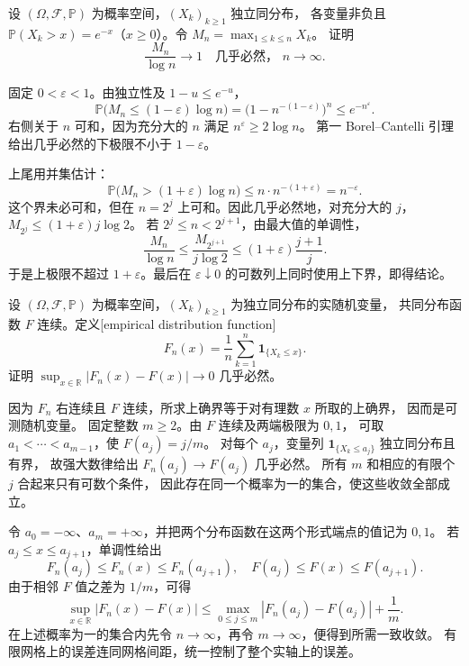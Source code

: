 \begin{optionalexercise}\label{b1:ex:30-exponential-maximum}
设 \((\Omega,\mathcal F,\mathbb P)\) 为概率空间，\((X_k)_{k\geq1}\) 独立同分布，
各变量非负且 \(\mathbb P(X_k>x)=e^{-x}\)（\(x\geq0\)）。令 \(M_n=\max_{1\leq k\leq n}X_k\)。
证明
\[
 \frac{M_n}{\log n}\longrightarrow1\quad\text{几乎必然， }n\to\infty.
\]
\end{optionalexercise}
\begin{solution}
固定 \(0<\varepsilon<1\)。由独立性及 \(1-u\leq e^{-u}\)，
\[
 \mathbb P\bigl(M_n\leq(1-\varepsilon)\log n\bigr)
 =\bigl(1-n^{-(1-\varepsilon)}\bigr)^n
 \leq e^{-n^\varepsilon}.
\]
右侧关于 \(n\) 可和，因为充分大的 \(n\) 满足 \(n^\varepsilon\geq2\log n\)。
第一 Borel--Cantelli 引理给出几乎必然的下极限不小于 \(1-\varepsilon\)。

上尾用并集估计：
\[
 \mathbb P\bigl(M_n>(1+\varepsilon)\log n\bigr)
 \leq n\cdot n^{-(1+\varepsilon)}=n^{-\varepsilon}.
\]
这个界未必可和，但在 \(n=2^j\) 上可和。因此几乎必然地，对充分大的 \(j\)，
\(M_{2^j}\leq(1+\varepsilon)j\log2\)。
若 \(2^j\leq n<2^{j+1}\)，由最大值的单调性，
\[
 \frac{M_n}{\log n}
 \leq\frac{M_{2^{j+1}}}{j\log2}
 \leq(1+\varepsilon)\frac{j+1}{j}.
\]
于是上极限不超过 \(1+\varepsilon\)。最后在 \(\varepsilon\downarrow0\) 的可数列上同时使用上下界，即得结论。
\end{solution}

\begin{optionalexercise}\label{b1:ex:30-empirical-cdf}
设 \((\Omega,\mathcal F,\mathbb P)\) 为概率空间，\((X_k)_{k\geq1}\) 为独立同分布的实随机变量，
共同分布函数 \(F\) 连续。定义[empirical distribution function]
\[
 F_n(x)=\frac1n\sum_{k=1}^n\mathbf1_{\{X_k\leq x\}}.
\]
证明 \(\sup_{x\in\mathbb R}|F_n(x)-F(x)|\to0\) 几乎必然。
\end{optionalexercise}
\begin{solution}
因为 \(F_n\) 右连续且 \(F\) 连续，所求上确界等于对有理数 \(x\) 所取的上确界，
因而是可测随机变量。
固定整数 \(m\geq2\)。由 \(F\) 连续及两端极限为 \(0,1\)，
可取 \(a_1<\cdots<a_{m-1}\)，使 \(F(a_j)=j/m\)。
对每个 \(a_j\)，变量列 \(\mathbf1_{\{X_k\leq a_j\}}\) 独立同分布且有界，
故强大数律给出 \(F_n(a_j)\to F(a_j)\) 几乎必然。
所有 \(m\) 和相应的有限个 \(j\) 合起来只有可数个条件，
因此存在同一个概率为一的集合，使这些收敛全部成立。

令 \(a_0=-\infty\)、\(a_m=+\infty\)，并把两个分布函数在这两个形式端点的值记为 \(0,1\)。
若 \(a_j\leq x\leq a_{j+1}\)，单调性给出
\[
 F_n(a_j)\leq F_n(x)\leq F_n(a_{j+1}),\quad
 F(a_j)\leq F(x)\leq F(a_{j+1}).
\]
由于相邻 \(F\) 值之差为 \(1/m\)，可得
\[
 \sup_{x\in\mathbb R}|F_n(x)-F(x)|
 \leq\max_{0\leq j\leq m}|F_n(a_j)-F(a_j)|+\frac1m.
\]
在上述概率为一的集合内先令 \(n\to\infty\)，再令 \(m\to\infty\)，便得到所需一致收敛。
有限网格上的误差连同网格间距，统一控制了整个实轴上的误差。
\end{solution}

